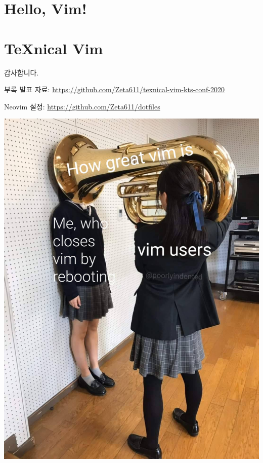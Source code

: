 \documentclass{beamer}
\begin{document}
\section{Hello, Vim!}

\section{\TeX{}nical Vim}

\begin{frame}[standout]
  감사합니다.
\end{frame}

\begin{frame}{부록}
  발표 자료: \url{https://github.com/Zeta611/texnical-vim-kts-conf-2020}

  Neovim 설정: \url{https://github.com/Zeta611/dotfiles}

  \centering\includegraphics[width=0.35\linewidth]{figures/how-great-vim-is}
\end{frame}
\end{document}
